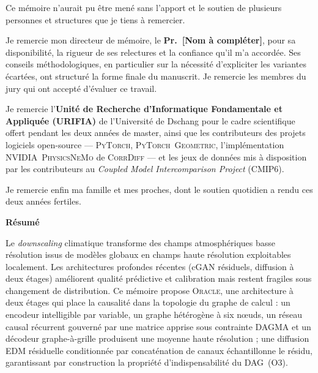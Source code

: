 \documentclass[14pt,a4paper,openany]{extreport}
\theoremstyle{definition}
\newcommand{\Oracle}{\textsc{Oracle}}
\begin{document}
Ce mémoire n'aurait pu être mené sans l'apport et le soutien de plusieurs personnes et structures que je tiens à remercier.

Je remercie mon directeur de mémoire, le \textbf{Pr.~[Nom à compléter]}, pour sa disponibilité, la rigueur de ses relectures et la confiance qu'il m'a accordée. Ses conseils méthodologiques, en particulier sur la nécessité d'expliciter les variantes écartées, ont structuré la forme finale du manuscrit. Je remercie les membres du jury qui ont accepté d'évaluer ce travail.

Je remercie l'\textbf{Unité de Recherche d'Informatique Fondamentale et Appliquée (URIFIA)} de l'Université de Dschang pour le cadre scientifique offert pendant les deux années de master, ainsi que les contributeurs des projets logiciels open-source --- \textsc{PyTorch}, \textsc{PyTorch~Geometric}, l'implémentation \textsc{NVIDIA~PhysicsNeMo} de \textsc{CorrDiff} --- et les jeux de données mis à disposition par les contributeurs au \emph{Coupled Model Intercomparison Project} (CMIP6).

Je remercie enfin ma famille et mes proches, dont le soutien quotidien a rendu ces deux années fertiles.

\clearpage
\thispagestyle{plain}

\begingroup
\small
\setlength{\parskip}{0.3em}

\begin{center}{\large\bfseries\color{uridarkblue}Résumé}\end{center}

Le \emph{downscaling} climatique transforme des champs atmosphériques basse résolution issus de modèles globaux en champs haute résolution exploitables localement. Les architectures profondes récentes (cGAN résiduels, diffusion à deux étages) améliorent qualité prédictive et calibration mais restent fragiles sous changement de distribution. Ce mémoire propose \Oracle{}, une architecture à deux étages qui place la causalité dans la topologie du graphe de calcul : un encodeur intelligible par variable, un graphe hétérogène à six nœuds, un réseau causal récurrent gouverné par une matrice apprise sous contrainte DAGMA et un décodeur graphe-à-grille produisent une moyenne haute résolution ; une diffusion EDM résiduelle conditionnée par concaténation de canaux échantillonne le résidu, garantissant par construction la propriété d'indispensabilité du DAG~(O3).
\end{document}
